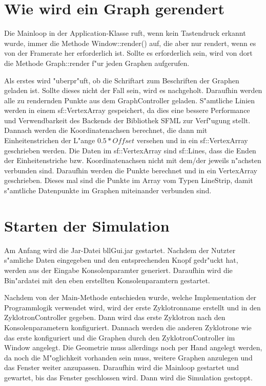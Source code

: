 \documentclass[14pt, a4paper]{report}
\begin{document}
\section{Wie wird ein Graph gerendert}
Die Mainloop in der Application-Klasse ruft, wenn kein Tastendruck erkannt wurde, immer
die Methode Window::render() auf, die aber nur rendert, wenn es von der Framerate her
erforderlich ist. Sollte es erforderlich sein, wird von dort die Methode Graph::render
f"ur jeden Graphen aufgerufen.

Als erstes wird "uberpr"uft, ob die Schriftart zum Beschriften der Graphen geladen ist.
Sollte dieses nicht der Fall sein, wird es nachgeholt. Daraufhin werden alle zu 
rendernden Punkte aus dem GraphController geladen. S"amtliche Linien werden in 
einem sf::VertexArray gespeichert, da dies eine bessere Performance und Verwendbarkeit des
Backends der Bibliothek SFML zur Verf"ugung stellt. Dannach werden die Koordinatenachsen 
berechnet, die dann mit Einheitenstrichen der L"ange $0.5 * Offset$ versehen und
in ein sf::VertexArray geschrieben werden. 
Die Daten im sf::VertexArray sind sf::Lines, dass die Enden der Einheitenstriche 
bzw. Koordinatenachsen nicht mit dem/der jeweils
n"achsten verbunden sind. Daraufhin werden die Punkte berechnet und in ein VertexArray
geschrieben. Dieses mal sind die Punkte im Array vom Typen LineStrip, damit 
s"amtliche Datenpunkte im Graphen miteinander verbunden sind.

\section{Starten der Simulation}
Am Anfang wird die Jar-Datei bllGui.jar gestartet. Nachdem der Nutzter s"amliche Daten
eingegeben und den entsprechenden Knopf gedr"uckt hat, werden aus der Eingabe 
Konsolenparamter generiert. Daraufhin wird die Bin"ardatei mit den eben erstellten
Konsolenparamtern gestartet.

Nachdem von der Main-Methode entschieden wurde, welche Implementation der Programmlogik verwendet wird,
wird der erste Zyklotronname erstellt und in den ZyklotronController gegeben. Dann
wird das erste Zyklotron nach den Konsolenparametern konfiguriert. Dannach werden die
anderen Zyklotrone wie das erste konfiguriert und die Graphen durch den
ZyklotronController im Window angelegt. Die Geometrie muss allerdings noch per Hand 
angelegt werden, da noch die M"oglichkeit vorhanden sein muss, weitere Graphen anzulegen
und das Fenster weiter anzupassen. Daraufhin wird die Mainloop gestartet und gewartet,
bis das Fenster geschlossen wird. Dann wird die Simulation gestoppt.
\end{document}
